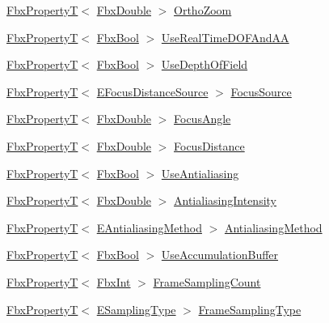 \begin{DoxyCompactItemize}
\item 
\hyperlink{class_fbx_property_t}{Fbx\+PropertyT}$<$ \hyperlink{fbxtypes_8h_a171e72a1c46fc15c1a6c9c31948c1c5b}{Fbx\+Double} $>$ \hyperlink{class_fbx_camera_a038fab99051fa0171f60f40469eff7cc}{Ortho\+Zoom}
\item 
\hyperlink{class_fbx_property_t}{Fbx\+PropertyT}$<$ \hyperlink{fbxtypes_8h_a92e0562b2fe33e76a242f498b362262e}{Fbx\+Bool} $>$ \hyperlink{class_fbx_camera_a57b4706a5d4d2678c5e31430b9a4ba61}{Use\+Real\+Time\+D\+O\+F\+And\+AA}
\item 
\hyperlink{class_fbx_property_t}{Fbx\+PropertyT}$<$ \hyperlink{fbxtypes_8h_a92e0562b2fe33e76a242f498b362262e}{Fbx\+Bool} $>$ \hyperlink{class_fbx_camera_a5b101aeb02696ef3e140505f01e6f797}{Use\+Depth\+Of\+Field}
\item 
\hyperlink{class_fbx_property_t}{Fbx\+PropertyT}$<$ \hyperlink{class_fbx_camera_a1b50e7b2953019a40328599679071ad4}{E\+Focus\+Distance\+Source} $>$ \hyperlink{class_fbx_camera_a17f0c0c82ed8df4540d918567edcbd4a}{Focus\+Source}
\item 
\hyperlink{class_fbx_property_t}{Fbx\+PropertyT}$<$ \hyperlink{fbxtypes_8h_a171e72a1c46fc15c1a6c9c31948c1c5b}{Fbx\+Double} $>$ \hyperlink{class_fbx_camera_af6d282d878bc8ad143c8095e29a4e94a}{Focus\+Angle}
\item 
\hyperlink{class_fbx_property_t}{Fbx\+PropertyT}$<$ \hyperlink{fbxtypes_8h_a171e72a1c46fc15c1a6c9c31948c1c5b}{Fbx\+Double} $>$ \hyperlink{class_fbx_camera_af6165df26c7d25156163a3ed2a2f99c2}{Focus\+Distance}
\item 
\hyperlink{class_fbx_property_t}{Fbx\+PropertyT}$<$ \hyperlink{fbxtypes_8h_a92e0562b2fe33e76a242f498b362262e}{Fbx\+Bool} $>$ \hyperlink{class_fbx_camera_a2d23acad0d49eadb63be01b826404d34}{Use\+Antialiasing}
\item 
\hyperlink{class_fbx_property_t}{Fbx\+PropertyT}$<$ \hyperlink{fbxtypes_8h_a171e72a1c46fc15c1a6c9c31948c1c5b}{Fbx\+Double} $>$ \hyperlink{class_fbx_camera_a3e7ddc27aff98a3850f58d8b800b6613}{Antialiasing\+Intensity}
\item 
\hyperlink{class_fbx_property_t}{Fbx\+PropertyT}$<$ \hyperlink{class_fbx_camera_a44949ea304940f214a2f23a66dcbf45f}{E\+Antialiasing\+Method} $>$ \hyperlink{class_fbx_camera_a1ad348a909fc9cd51173f5a424660ac1}{Antialiasing\+Method}
\item 
\hyperlink{class_fbx_property_t}{Fbx\+PropertyT}$<$ \hyperlink{fbxtypes_8h_a92e0562b2fe33e76a242f498b362262e}{Fbx\+Bool} $>$ \hyperlink{class_fbx_camera_ae858c35fdbb3ec3bb853bfa739dd2fad}{Use\+Accumulation\+Buffer}
\item 
\hyperlink{class_fbx_property_t}{Fbx\+PropertyT}$<$ \hyperlink{fbxtypes_8h_a088fa96de3b0b3ea69f0f6afef525dfb}{Fbx\+Int} $>$ \hyperlink{class_fbx_camera_a71ee6802b2a63149cfa33f11548893ea}{Frame\+Sampling\+Count}
\item 
\hyperlink{class_fbx_property_t}{Fbx\+PropertyT}$<$ \hyperlink{class_fbx_camera_aed549486ed0985230efca6fae0d731ae}{E\+Sampling\+Type} $>$ \hyperlink{class_fbx_camera_ab2048abc7b353f908a7c3caba7d0acf2}{Frame\+Sampling\+Type}
\end{DoxyCompactItemize}
